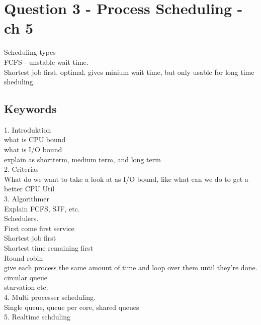 \documentclass[a4paper,10pt,titlepage]{report}
\begin{document}
\newpage

\section{Question 3 - Process Scheduling - ch 5}
Scheduling types\\
FCFS - unstable wait time.\\
Shortest job first. optimal. gives minium wait time, but only usable for long time sheduling.\\
\vspace{5mm}

\subsection{Keywords}
1. Introduktion\\
\hspace{10mm}what is CPU bound\\
\hspace{10mm}what is I/O bound\\
\hspace{10mm}explain as shortterm, medium term, and long term\\
2. Criterias\\
\hspace{10mm}What do we want to take a look at as I/O bound, like what can we do to get a better CPU Util\\
3. Algorithmer \\ 
\hspace{10mm}Explain FCFS, SJF, etc.\\
\hspace{10mm} Schedulers.\\
\hspace{15mm} First come first service\\
\hspace{15mm} Shortest job first \\
\hspace{15mm} Shortest time remaining first \\
\hspace{15mm} Round robin\\
\hspace{15mm}give each process the same amount of time and loop over them until they're done. circular queue\\
\hspace{10mm}starvation etc. \\
4. Multi processer scheduling.\\
\hspace{10mm}Single queue, queue per core, shared queues\\
5. Realtime schduling\\
\end{document}
